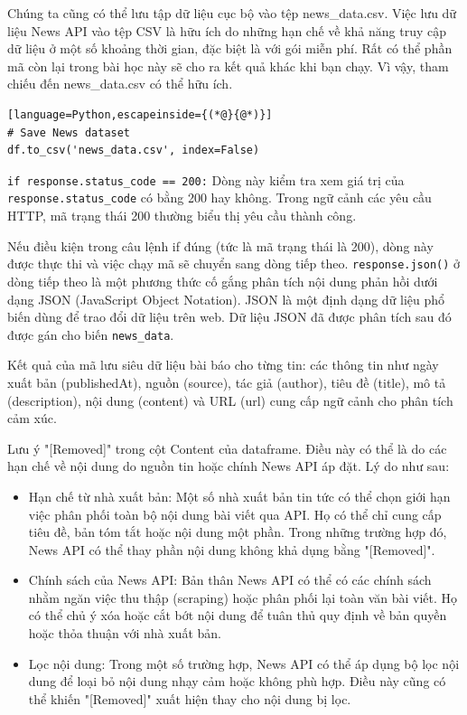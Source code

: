 Chúng ta cũng có thể lưu tập dữ liệu cục bộ vào tệp news\_data.csv. Việc lưu dữ liệu News API vào tệp CSV là hữu ích do những hạn chế về khả năng truy cập dữ liệu ở một số khoảng thời gian, đặc biệt là với gói miễn phí. Rất có thể phần mã còn lại trong bài học này sẽ cho ra kết quả khác khi bạn chạy. Vì vậy, tham chiếu đến news\_data.csv có thể hữu ích.

\begin{lstlisting}[language=Python,escapeinside={(*@}{@*)}]
# Save News dataset
df.to_csv('news_data.csv', index=False)
\end{lstlisting}

\texttt{if\ response.status\_code\ ==\ 200:} Dòng này kiểm tra xem giá trị của \texttt{response.status\_code} có bằng 200 hay không. Trong ngữ cảnh các yêu cầu HTTP, mã trạng thái 200 thường biểu thị yêu cầu thành công.

Nếu điều kiện trong câu lệnh if đúng (tức là mã trạng thái là 200), dòng này được thực thi và việc chạy mã sẽ chuyển sang dòng tiếp theo. \texttt{response.json()} ở dòng tiếp theo là một phương thức cố gắng phân tích nội dung phản hồi dưới dạng JSON (JavaScript Object Notation). JSON là một định dạng dữ liệu phổ biến dùng để trao đổi dữ liệu trên web. Dữ liệu JSON đã được phân tích sau đó được gán cho biến \texttt{news\_data}.

Kết quả của mã lưu siêu dữ liệu bài báo cho từng tin: các thông tin như ngày xuất bản (publishedAt), nguồn (source), tác giả (author), tiêu đề (title), mô tả (description), nội dung (content) và URL (url) cung cấp ngữ cảnh cho phân tích cảm xúc.

Lưu ý "{[}Removed{]}" trong cột Content của dataframe. Điều này có thể là do các hạn chế về nội dung do nguồn tin hoặc chính News API áp đặt. Lý do như sau:

\begin{itemize}
\item
  Hạn chế từ nhà xuất bản: Một số nhà xuất bản tin tức có thể chọn giới hạn việc phân phối toàn bộ nội dung bài viết qua API. Họ có thể chỉ cung cấp tiêu đề, bản tóm tắt hoặc nội dung một phần. Trong những trường hợp đó, News API có thể thay phần nội dung không khả dụng bằng "{[}Removed{]}".
\item
  Chính sách của News API: Bản thân News API có thể có các chính sách nhằm ngăn việc thu thập (scraping) hoặc phân phối lại toàn văn bài viết. Họ có thể chủ ý xóa hoặc cắt bớt nội dung để tuân thủ quy định về bản quyền hoặc thỏa thuận với nhà xuất bản.
\item
  Lọc nội dung: Trong một số trường hợp, News API có thể áp dụng bộ lọc nội dung để loại bỏ nội dung nhạy cảm hoặc không phù hợp. Điều này cũng có thể khiến "{[}Removed{]}" xuất hiện thay cho nội dung bị lọc.
\end{itemize}

